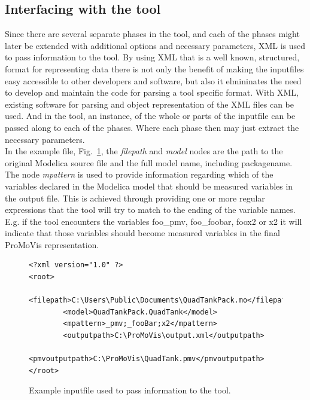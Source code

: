 \subsection{Interfacing with the tool}
Since there are several separate phases in the tool, and each of the phases might later be extended with additional options and necessary parameters, XML is used to pass information to the tool. By using XML that is a well known, structured, format for representing data there is not only the benefit of making the inputfiles easy accessible to other developers and software, but also it elmininates the need to develop and maintain the code for parsing a tool specific format. With XML, existing software for parsing and object representation of the XML files can be used. And in the tool, an instance, of the whole or parts of the inputfile can be passed along to each of the phases. Where each phase then may just extract the necessary parameters. \\\newline %
In the example file,  Fig.~\ref{fig:coding},  %
the \textit{filepath} and \textit{model} nodes are the path to the original Modelica source file and the full model name, including packagename. The node \textit{mpattern} is used to provide information regarding which of the variables declared in the Modelica model that should be measured variables in the output file. This is achieved through providing one or more regular expressions that the tool will try to match to the ending of the variable names. E.g. if the tool encounters the variables foo\_pmv, foo\_foobar, foox2 or x2 it will indicate that those variables should become measured variables in the final ProMoVis representation.
%
\begin{figure}
\lstset{language=XML}
\begin{lstlisting}
<?xml version="1.0" ?> 
<root>
        <filepath>C:\Users\Public\Documents\QuadTankPack.mo</filepath>
        <model>QuadTankPack.QuadTank</model>
        <mpattern>_pmv;_fooBar;x2</mpattern>
        <outputpath>C:\ProMoVis\output.xml</outputpath>
        <pmvoutputpath>C:\ProMoVis\QuadTank.pmv</pmvoutputpath>
</root>
\end{lstlisting}
\caption{Example inputfile used to pass information to the tool.}
\label{fig:coding}
\end{figure} 
%

